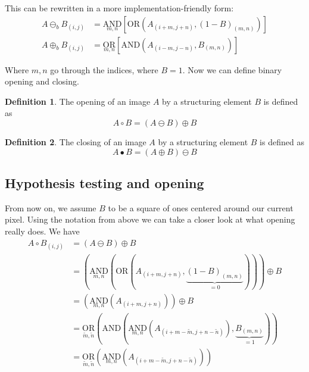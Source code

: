 \documentclass[a4paper,12pt]{article}
\theoremstyle{plain}
\theoremstyle{definition}
\newtheorem{definition}{Definition}
\theoremstyle{remark}
\begin{document}
This can be rewritten in a more implementation-friendly form:
\begin{align*}
	A \ominus_b B_{(i, j)} &= \underset{m, n}{\mathrm{AND}} [ \mathrm{OR} (A_{(i + m, j + n)}, (1 - B)_{(m, n)}) ] \\
	A \oplus_b B_{(i, j)} &= \underset{m, n}{\mathrm{OR}} [ \mathrm{AND} (A_{(i - m, j - n)}, B_{(m, n)}) ]
\end{align*}

Where $m, n$ go through the indices, where $B = 1$. Now we can define binary opening and closing.

\begin{definition}
	The opening of an image $A$ by a structuring element $B$ is defined as
	\begin{equation*}
		A \circ B = (A \ominus B) \oplus B
	\end{equation*}
\end{definition}
\begin{definition}
	The closing of an image $A$ by a structuring element $B$ is defined as
	\begin{equation*}
		A \bullet B = (A \oplus B) \ominus B
	\end{equation*}
\end{definition}

\subsection{Hypothesis testing and opening}

From now on, we assume $B$ to be a square of ones centered around our current pixel. Using the notation from above we can take a closer look at what opening really does. We have
\begin{align*}
	A \circ B_{(i, j)} &= (A \ominus B) \oplus B \\
	&= ( \underset{m, n}{\mathrm{AND}} ( \mathrm{OR} (A_{(i + m, j + n)}, \underbrace{(1 - B)_{(m, n)}}_{= 0} ) ) ) \oplus B \\
	&= ( \underset{m, n}{\mathrm{AND}} ( A_{(i + m, j + n)} ) ) \oplus B \\
	&= \underset{\tilde{m}, \tilde{n}}{\mathrm{OR}} ( \mathrm{AND} (\underset{m, n}{\mathrm{AND}} ( A_{(i + m - \tilde{m}, j + n - \tilde{n})} ), \underbrace{B_{(m, n)}}_{= 1} ) ) \\
	&= \underset{\tilde{m}, \tilde{n}}{\mathrm{OR}} ( \underset{m, n}{\mathrm{AND}} ( A_{(i + m - \tilde{m}, j + n - \tilde{n})} ) )
\end{align*}
\end{document}
